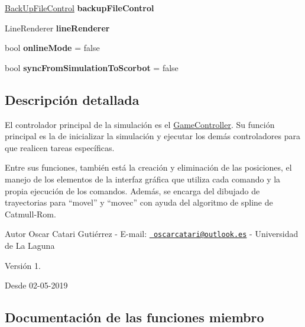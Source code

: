 \begin{DoxyCompactItemize}
\mbox{\hyperlink{class_back_up_file_control}{Back\+Up\+File\+Control}} {\bfseries backup\+File\+Control}
\item 
\mbox{\label{class_game_controller_a3bccbef8df8f2586edd74ba0013ec357}} 
Line\+Renderer {\bfseries line\+Renderer}
\item 
\mbox{\label{class_game_controller_a08c2e64ae7139eba0487f697aa298d31}} 
bool {\bfseries online\+Mode} = false
\item 
\mbox{\label{class_game_controller_ad73824064692e5e0e0b51106f962fc16}} 
bool {\bfseries sync\+From\+Simulation\+To\+Scorbot} = false
\end{DoxyCompactItemize}


\subsection{Descripción detallada}
El controlador principal de la simulación es el \mbox{\hyperlink{class_game_controller}{Game\+Controller}}. Su función principal es la de inicializar la simulación y ejecutar los demás controladores para que realicen tareas específicas.

Entre sus funciones, también está la creación y eliminación de las posiciones, el manejo de los elementos de la interfaz gráfica que utiliza cada comando y la propia ejecución de los comandos. Además, se encarga del dibujado de trayectorias para “movel” y “movec” con ayuda del algoritmo de spline de Catmull-\/\+Rom. \begin{DoxyAuthor}{Autor}
Oscar Catari Gutiérrez -\/ E-\/mail\+: \href{mailto:oscarcatari@outlook.es}{\texttt{ oscarcatari@outlook.\+es}} -\/ Universidad de La Laguna 
\end{DoxyAuthor}
\begin{DoxyVersion}{Versión}
1. 
\end{DoxyVersion}
\begin{DoxySince}{Desde}
02-\/05-\/2019 
\end{DoxySince}


\subsection{Documentación de las funciones miembro}
\mbox{\label{class_game_controller_a232d433ba9f07944bcc274841bf8cc7c}} 
